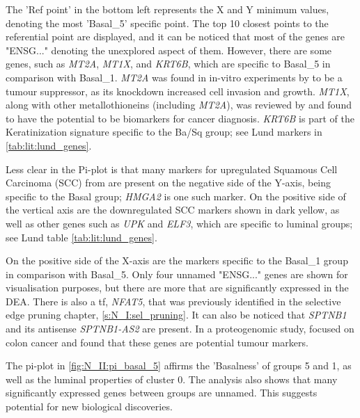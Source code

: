 The 'Ref point' in the bottom left represents the X and Y minimum values, denoting the most 'Basal\_5' specific point. The top 10 closest points to the referential point are displayed, and it can be noticed that most of the genes are "ENSG..." denoting the unexplored aspect of them. However, there are some genes, such as \textit{MT2A}, \textit{MT1X}, and \textit{KRT6B}, which are specific to Basal\_5 in comparison with Basal\_1. \textit{MT2A} was found in in-vitro experiments by \citep{Sung2022-tm} to be a tumour suppressor, as its knockdown increased cell invasion and growth. \textit{MT1X}, along with other metallothioneins (including \textit{MT2A}), was reviewed by \citep{Si2018-ep} and found to have the potential to be biomarkers for cancer diagnosis. \textit{KRT6B} is part of the Keratinization signature specific to the Ba/Sq group; see Lund markers in \cref{tab:lit:lund_genes}.

Less clear in the Pi-plot is that many markers for upregulated Squamous Cell Carcinoma (SCC) from \citep{Hurst2022-sp} are present on the negative side of the Y-axis, being specific to the Basal group; \textit{HMGA2} is one such marker. On the positive side of the vertical axis are the downregulated SCC markers shown in dark yellow, as well as other genes such as \textit{UPK} and \textit{ELF3}, which are specific to luminal groups; see Lund table \cref{tab:lit:lund_genes}.

On the positive side of the X-axis are the markers specific to the Basal\_1 group in comparison with Basal\_5. Only four unnamed "ENSG..." genes are shown for visualisation purposes, but there are more that are significantly expressed in the DEA. There is also a \acrlong{tf}, \textit{NFAT5}, that was previously identified in the selective edge pruning chapter, \cref{s:N_I:sel_pruning}. It can also be noticed that \textit{SPTNB1} and its antisense \textit{SPTNB1-AS2} are present. In a proteogenomic study, \citep{Fanayan2013-uj} focused on colon cancer and found that these genes are potential tumour markers.

The pi-plot in \cref{fig:N_II:pi_basal_5} affirms the 'Basalness' of groups 5 and 1, as well as the luminal properties of cluster 0. The analysis also shows that many significantly expressed genes between groups are unnamed. This suggests potential for new biological discoveries.


